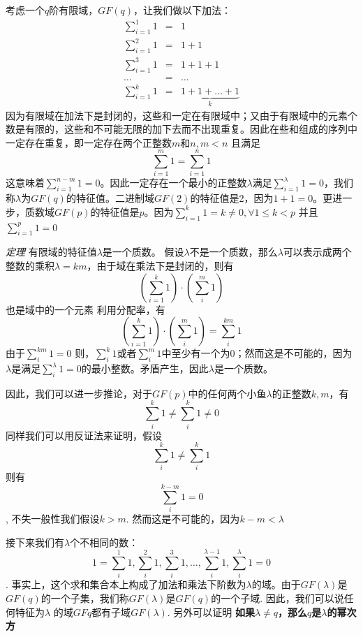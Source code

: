 \documentclass[10pt,a4paper,UTF8]{article}
\begin{document}
考虑一个\(q\)阶有限域，\(GF(q)\)，让我们做以下加法：
\begin{eqnarray*}
\sum_{i=1}^{1}1 &=& 1 \\
\sum_{i=1}^{2}1 &=& 1+1 \\
\sum_{i=1}^{3}1 &=& 1+1+1 \\
\ldots &=& \ldots \\
\sum_{i=1}^{k}1 &=& \underbrace{1+1+\ldots+1}_{k}
\end{eqnarray*}
因为有限域在加法下是封闭的，这些和一定在有限域中；又由于有限域中的元素个数是有限的，这些和不可能无限的加下去而不出现重复。因此在些和组成的序列中一定存在重复，即一定存在两个正整数\(m\)和\(n, m < n\) 且满足\[\sum_{i=1}^{m}1=\sum_{i=1}^{n} 1\] 这意味着\(\sum_{i=1}^{n-m}1=0\)。因此一定存在一个最小的正整数\(\lambda\)满足\(\sum_{i=1}^{\lambda}1=0\)，我们称\(\lambda\)为\(GF(q)\)的特征值。二进制域\(GF(2)\)的特征值是2，因为\(1+1=0\)。更进一步，质数域\(GF(p)\)的特征值是\(p\)。因为\(\sum_{i=1}^{k}1 = k \neq 0, \forall 1\leq k < p\) 并且 \(\sum_{i=1}^{p}1 = 0\)

\emph{定理} 有限域的特征值\(\lambda\)是一个质数。
假设\(\lambda\)不是一个质数，那么\(\lambda\)可以表示成两个整数的乘积\(\lambda = km\)，由于域在乘法下是封闭的，则有\[\left(\sum_{i=1}^{k}1  \right)\cdot \left(\sum_{i}^{m}1\right) \]也是域中的一个元素 利用分配率，有\[\left(\sum_{i=1}^{k}1  \right)\cdot \left(\sum_{i}^{m}1\right) = \sum_{i}^{km}1\] 由于\(\sum_{i}^{km}1 = 0\) 则，\(\sum_{i}^{k}1\)或者\(\sum_{i}^{m}1\)中至少有一个为0；然而这是不可能的，因为\(\lambda\)是满足\(\sum_{i}^{\lambda}1 = 0\)的最小整数。矛盾产生，因此\(\lambda\)是一个质数。

因此，我们可以进一步推论，对于\(GF(p)\)中的任何两个小鱼\(\lambda\)的正整数\(k,m\)，有\[\sum_{i}^{k}1 \neq \sum_{i}^{k}1 \neq 0\] 同样我们可以用反证法来证明，假设\[\sum_{i}^{k}1 \neq \sum_{i}^{k}1\] 则有\[\sum_{i}^{k-m}1  = 0\], 不失一般性我们假设\(k > m\). 然而这是不可能的，因为\(k - m < \lambda\)

接下来我们有\(\lambda\)个不相同的数：\[1= \sum_{i}^{1}1, \sum_{i}^{2}1,\sum_{i}^{3}1, \ldots, \sum_{i}^{\lambda -1}1, \sum_{i}^{\lambda}1=0\]. 事实上，这个求和集合本上构成了加法和乘法下阶数为\(\lambda\)的域。由于\(GF(\lambda)\)是\(GF(q)\)的一个子集，我们称\(GF(\lambda)\)是\(GF(q)\)的一个子域. 因此，我们可以说任何特征为\(\lambda\) 的域\(GF{q}\)都有子域\(GF(\lambda)\). 另外可以证明 \textbf{如果\(\lambda \neq q\)，那么\(q\)是\(\lambda\)的幂次方}
\end{document}
